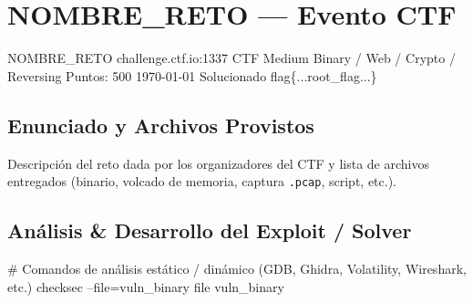 \documentclass[../../../main_compilation.tex]{subfiles}
\begin{document}

\section[CTF - NOMBRE\_RETO (Evento)]{NOMBRE\_RETO — Evento CTF}
\label{sec:ctf-nombre-reto}

\targetSummary%
  {NOMBRE\_RETO}%
  {challenge.ctf.io:1337}%
  {CTF}%
  {Medium}%
  {Binary / Web / Crypto / Reversing}%
  {Puntos: 500}%
  {\today}%
  {Solucionado}%
  {flag\{...root\_flag...\}}%

\vspace{0.4cm}

\subsection{Enunciado y Archivos Provistos}
Descripción del reto dada por los organizadores del CTF y lista de archivos entregados (binario, volcado de memoria, captura \texttt{.pcap}, script, etc.).

\subsection{Análisis \& Desarrollo del Exploit / Solver}

\begin{terminal}
# Comandos de análisis estático / dinámico (GDB, Ghidra, Volatility, Wireshark, etc.)
checksec --file=vuln_binary
file vuln_binary
\end{terminal}
\end{document}
